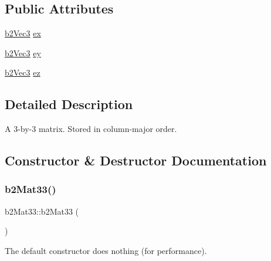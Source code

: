 \subsection*{Public Attributes}
\begin{DoxyCompactItemize}
\item 
\mbox{\hyperlink{structb2_vec3}{b2\+Vec3}} \mbox{\hyperlink{structb2_mat33_a132f00e6550d1e19c75fb60ce1229638}{ex}}
\item 
\mbox{\hyperlink{structb2_vec3}{b2\+Vec3}} \mbox{\hyperlink{structb2_mat33_ababc69c718c73a04a651f7a6a981ecf4}{ey}}
\item 
\mbox{\hyperlink{structb2_vec3}{b2\+Vec3}} \mbox{\hyperlink{structb2_mat33_ae700fc46f679b4ef211a2517005b0557}{ez}}
\end{DoxyCompactItemize}


\subsection{Detailed Description}
A 3-\/by-\/3 matrix. Stored in column-\/major order. 

\subsection{Constructor \& Destructor Documentation}
\mbox{\label{structb2_mat33_a1f4d7ddf1c8a202fc08ec64dfe191463}} 
\subsubsection{\texorpdfstring{b2Mat33()}{b2Mat33()}\hspace{0.1cm}{\footnotesize\ttfamily [1/2]}}
{\footnotesize\ttfamily b2\+Mat33\+::b2\+Mat33 (\begin{DoxyParamCaption}{ }\end{DoxyParamCaption})\hspace{0.3cm}{\ttfamily [inline]}}



The default constructor does nothing (for performance). 

\mbox{\label{structb2_mat33_a36d99a037008776c8d09fe0aeb5c759c}} 
